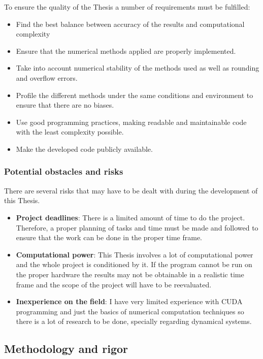 To ensure the quality of the Thesis a number of requirements must be fulfilled:
\begin{itemize}
    \item Find the best balance between accuracy of the results and computational complexity
    \item Ensure that the numerical methods applied are properly implemented.
    \item Take into account numerical stability of the methods used as well as rounding and overflow errors.
    \item Profile the different methods under the same conditions and environment to ensure that there are no biases.
    \item Use good programming practices, making readable and maintainable code with the least complexity possible.
    \item Make the developed code publicly available.
\end{itemize}

\subsubsection{Potential obstacles and risks}

There are several risks that may have to be dealt with during the development of this Thesis.

\begin{itemize}
    \item \textbf{Project deadlines}: There is a limited amount of time to do
        the project. Therefore, a proper planning of tasks and time must be made
        and followed to ensure that the work can be done in the proper time
        frame.
    \item \textbf{Computational power}: This Thesis involves a lot of
        computational power and the whole project is conditioned by it. If the
        program cannot be run on the proper hardware the results may not be
        obtainable in a realistic time frame and the scope of the project will
        have to be reevaluated.
    \item \textbf{Inexperience on the field}: I have very limited experience
        with CUDA programming and just the basics of numerical computation
        techniques so there is a lot of research to be done, specially regarding
        dynamical systems.
\end{itemize}

\pagebreak
\subsection{Methodology and rigor}

